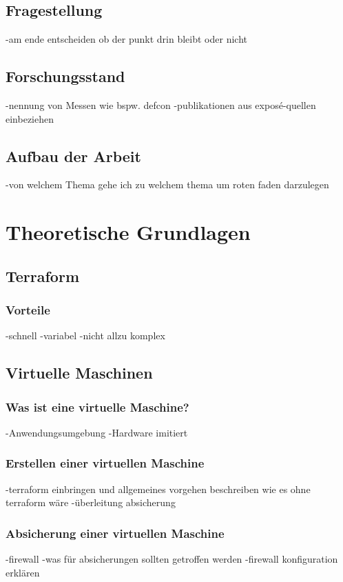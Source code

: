 \documentclass[12pt,oneside]{article}
\begin{document}
\subsection{Fragestellung}
-am ende entscheiden ob der punkt drin bleibt oder nicht
\subsection{Forschungsstand}
-nennung von Messen wie bspw. defcon
\newline
-publikationen aus exposé-quellen einbeziehen
\subsection{Aufbau der Arbeit}
-von welchem Thema gehe ich zu welchem thema um roten faden darzulegen
\newpage

\section{Theoretische Grundlagen} 
\subsection{Terraform}


\subsubsection{Vorteile}
-schnell
\newline
-variabel
\newline
-nicht allzu komplex
\subsection{Virtuelle Maschinen}
\subsubsection{Was ist eine virtuelle Maschine?}
-Anwendungsumgebung
\newline
-Hardware imitiert

\subsubsection{Erstellen einer virtuellen Maschine}
-terraform einbringen und allgemeines vorgehen beschreiben wie es ohne terraform wäre
\newline
-überleitung absicherung
\subsubsection{Absicherung einer virtuellen Maschine}
-firewall 
\newline
-was für absicherungen sollten getroffen werden
\newline
-firewall konfiguration erklären
\end{document}
